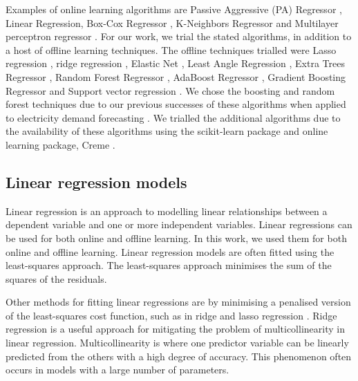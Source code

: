 Examples of online learning algorithms are Passive Aggressive (PA) Regressor \cite{Gzik2014}, Linear Regression, Box-Cox Regressor \cite{Box1964}, K-Neighbors Regressor \cite{forgy65} and Multilayer perceptron regressor \cite{Hinton1989}. For our work, we trial the stated algorithms, in addition to a host of offline learning techniques. The offline techniques trialled were Lasso regression \cite{Tibshirani1996a}, ridge regression \cite{GeladiPaul1994Mrac},  Elastic Net \cite{Geostatistics2010}, Least Angle Regression \cite{Fike1988}, Extra Trees Regressor \cite{Fike1988}, Random Forest Regressor \cite{Breiman2001}, AdaBoost Regressor \cite{Freund1997}, Gradient Boosting Regressor \cite{316} and Support vector regression \cite{Cortes1995}. We chose the boosting and random forest techniques due to our previous successes of these algorithms when applied to electricity demand forecasting \cite{Kell2018a}. We trialled the additional algorithms due to the availability of these algorithms using the scikit-learn package and online learning package, Creme \cite{creme, scikit-learn}. %


\subsection{Linear regression models}


Linear regression is an approach to modelling linear relationships between a dependent variable and one or more independent variables. Linear regressions can be used for both online and offline learning. In this work, we used them for both online and offline learning. Linear regression models are often fitted using the least-squares approach. The least-squares approach minimises the sum of the squares of the residuals. 

Other methods for fitting linear regressions are by minimising a penalised version of the least-squares cost function, such as in ridge and lasso regression \cite{GeladiPaul1994Mrac,Tibshirani1996a}. Ridge regression is a useful approach for mitigating the problem of multicollinearity in linear regression. Multicollinearity is where one predictor variable can be linearly predicted from the others with a high degree of accuracy. This phenomenon often occurs in models with a large number of parameters. 

